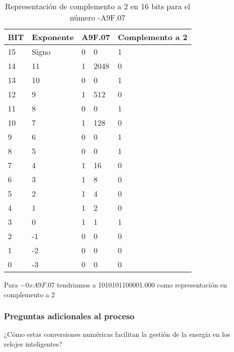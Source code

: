 \documentclass[stu, 12pt, letterpaper, donotrepeattitle, floatsintext, natbib]{apa7}
\begin{document}
\begin{table}[]
\caption{Representación de complemento a 2 en 16 bits para el número -A9F.07}
\begin{tabular}{|l|l|ll|l|}
\hline
BIT & Exponente & \multicolumn{2}{l|}{A9F.07}   & Complemento a 2 \\ \hline
15  & Signo     & \multicolumn{1}{l|}{0} & 0    & 1               \\ \hline
14  & 11        & \multicolumn{1}{l|}{1} & 2048 & 0               \\ \hline
13  & 10        & \multicolumn{1}{l|}{0} & 0    & 1               \\ \hline
12  & 9         & \multicolumn{1}{l|}{1} & 512  & 0               \\ \hline
11  & 8         & \multicolumn{1}{l|}{0} & 0    & 1               \\ \hline
10  & 7         & \multicolumn{1}{l|}{1} & 128  & 0               \\ \hline
9   & 6         & \multicolumn{1}{l|}{0} & 0    & 1               \\ \hline
8   & 5         & \multicolumn{1}{l|}{0} & 0    & 1               \\ \hline
7   & 4         & \multicolumn{1}{l|}{1} & 16   & 0               \\ \hline
6   & 3         & \multicolumn{1}{l|}{1} & 8    & 0               \\ \hline
5   & 2         & \multicolumn{1}{l|}{1} & 4    & 0               \\ \hline
4   & 1         & \multicolumn{1}{l|}{1} & 2    & 0               \\ \hline
3   & 0         & \multicolumn{1}{l|}{1} & 1    & 1               \\ \hline
2   & -1        & \multicolumn{1}{l|}{0} & 0    & 0               \\ \hline
1   & -2        & \multicolumn{1}{l|}{0} & 0    & 0               \\ \hline
0   & -3        & \multicolumn{1}{l|}{0} & 0    & 0               \\ \hline
\end{tabular}
\end{table}

Para $-0xA9F.07$ tendriamos a 1010101100001.000 como representación en complemento a 2

\subsubsection{Preguntas adicionales al proceso}
¿Cómo estas conversiones numéricas facilitan la gestión de la energía en los relojes inteligentes? 
\end{document}
